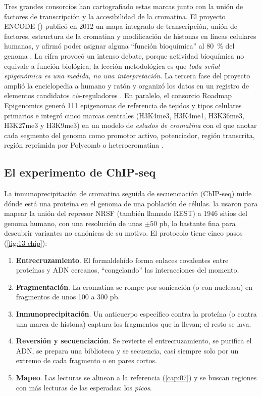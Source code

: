 Tres grandes consorcios han cartografiado estas marcas junto con la unión de factores de transcripción y la accesibilidad de la cromatina. El proyecto ENCODE () publicó en 2012 un mapa integrado de transcripción, unión de factores, estructura de la cromatina y modificación de histonas en líneas celulares humanas, y afirmó poder asignar alguna ``función bioquímica'' al \SI{80}{\percent} del genoma \parencite{c13-encode2012}. La cifra provocó un intenso debate, porque actividad bioquímica no equivale a función biológica; la lección metodológica es que \emph{toda señal epigenómica es una medida, no una interpretación}. La tercera fase del proyecto amplió la enciclopedia a humano y ratón y organizó los datos en un registro de elementos candidatos \emph{cis}-reguladores \parencite{c13-encode2020}. En paralelo, el consorcio Roadmap Epigenomics generó 111 epigenomas de referencia de tejidos y tipos celulares primarios e integró cinco marcas centrales (H3K4me3, H3K4me1, H3K36me3, H3K27me3 y H3K9me3) en un modelo de \emph{estados de cromatina} con el que anotar cada segmento del genoma como promotor activo, potenciador, región transcrita, región reprimida por Polycomb o heterocromatina \parencite{c13-kundaje2015}.

\subsection{El experimento de ChIP-seq}

La inmunoprecipitación de cromatina seguida de secuenciación (ChIP-seq) mide dónde está una proteína en el genoma de una población de células. \textcite{c13-johnson2007} la usaron para mapear la unión del represor NRSF (también llamado REST) a 1946 sitios del genoma humano, con una resolución de unas $\pm50$ pb, lo bastante fina para descubrir variantes no canónicas de su motivo. El protocolo tiene cinco pasos (\cref{fig:13-chip}):

\begin{enumerate}
  \item \textbf{Entrecruzamiento}. El formaldehído forma enlaces covalentes entre proteínas y ADN cercanos, ``congelando'' las interacciones del momento.
  \item \textbf{Fragmentación}. La cromatina se rompe por sonicación (o con nucleasa) en fragmentos de unos 100 a 300 pb.
  \item \textbf{Inmunoprecipitación}. Un anticuerpo específico contra la proteína (o contra una marca de histona) captura los fragmentos que la llevan; el resto se lava.
  \item \textbf{Reversión y secuenciación}. Se revierte el entrecruzamiento, se purifica el ADN, se prepara una biblioteca y se secuencia, casi siempre solo por un extremo de cada fragmento o en pares cortos.
  \item \textbf{Mapeo}. Las lecturas se alinean a la referencia (\cref{cap:07}) y se buscan regiones con más lecturas de las esperadas: los \emph{picos}.
\end{enumerate}

